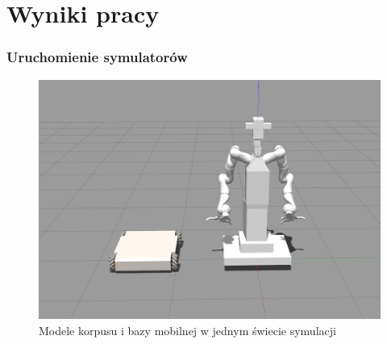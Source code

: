 \section{Wyniki pracy}


\begin{frame}
    \frametitle{Uruchomienie symulatorów}
    \begin{figure}
        \includegraphics[scale=0.20]{./images/velma+omnivelma_cropped.png}
        \caption{Modele korpusu i bazy mobilnej w jednym świecie symulacji}
    \end{figure}
\end{frame}


